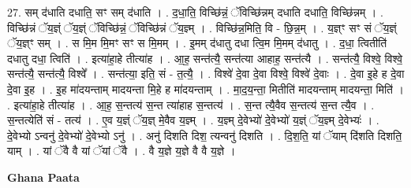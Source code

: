 \documentclass[17pt]{extarticle}
\begin{document}
27. सम् द॑धाति दधाति॒ सꣳ सम् द॑धाति । . द॒धा॒ति॒ विच्छि॑न्नं॒ ॅविच्छि॑न्नम् दधाति दधाति॒ विच्छि॑न्नम् । . विच्छि॑न्नं ॅय॒ज्ञ्ं ॅय॒ज्ञ्ं ॅविच्छि॑न्नं॒ ॅविच्छि॑न्नं ॅय॒ज्ञ्म् । . विच्छि॑न्न॒मिति॒ वि - छि॒न्न॒म् । . य॒ज्ञ्ꣳ सꣳ सं ॅय॒ज्ञ्ं ॅय॒ज्ञ्ꣳ सम् । . स मि॒म मि॒मꣳ सꣳ स मि॒मम् । . इ॒मम् द॑धातु दधा त्वि॒म मि॒मम् द॑धातु । . द॒धा॒ त्वितीति॑ दधातु दधा॒ त्विति॑ । . इत्या॑हा॒हे तीत्या॑ह । . आ॒ह॒ सन्त॑त्यै॒ सन्त॑त्या आहाह॒ सन्त॑त्यै । . सन्त॑त्यै॒ विश्वे॒ विश्वे॒ सन्त॑त्यै॒ सन्त॑त्यै॒ विश्वे᳚ । . सन्त॑त्या॒ इति॒ सं - त॒त्यै॒ । . विश्वे॑ दे॒वा दे॒वा विश्वे॒ विश्वे॑ दे॒वाः । . दे॒वा इ॒हे ह दे॒वा दे॒वा इ॒ह । . इ॒ह मा॑दयन्ताम् मादयन्ता मि॒हे ह मा॑दयन्ताम् । . मा॒द॒य॒न्ता॒ मितीति॑ मादयन्ताम् मादयन्ता॒ मिति॑ । . इत्या॑हा॒हे तीत्या॑ह । . आ॒ह॒ स॒न्तत्य॑ स॒न्त त्या॑हाह स॒न्तत्य॑ । . स॒न्त त्यै॒वैव स॒न्तत्य॑ स॒न्त त्यै॒व । . स॒न्तत्येति॑ सं - तत्य॑ । . ए॒व य॒ज्ञ्ं ॅय॒ज्ञ् मे॒वैव य॒ज्ञ्म् । . य॒ज्ञ्म् दे॒वेभ्यो॑ दे॒वेभ्यो॑ य॒ज्ञ्ं ॅय॒ज्ञ्म् दे॒वेभ्यः॑ । . दे॒वेभ्यो ऽन्वनु॑ दे॒वेभ्यो॑ दे॒वेभ्यो ऽनु॑ । . अनु॑ दिशति दिश॒ त्यन्वनु॑ दिशति । . दि॒श॒ति॒ यां ॅयाम् दि॑शति दिशति॒ याम् । . यां ॅवै वै यां ॅयां ॅवै । . वै य॒ज्ञे य॒ज्ञे वै वै य॒ज्ञे । \newline

\textbf{Ghana Paata } \newline
\end{document}
